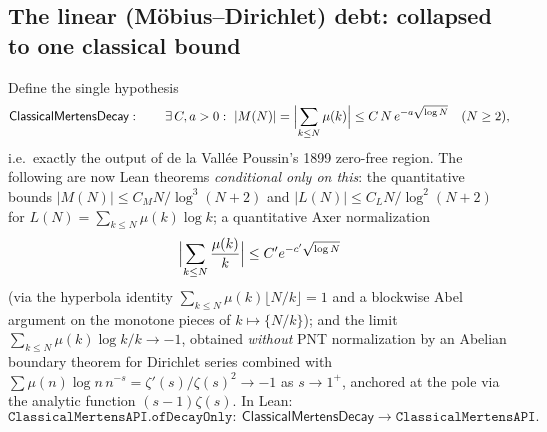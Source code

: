 \documentclass[11pt,a4paper]{article}
\newcommand{\fract}[1]{\{#1\}}
\begin{document}
\subsection{The linear (M\"obius--Dirichlet) debt: collapsed to one classical bound}
Define the single hypothesis
\[
\textsf{ClassicalMertensDecay}:\qquad
\exists\,C,a>0:\ |M(N)|=\Bigl|\sum_{k\le N}\mu(k)\Bigr|\le C\,N\,e^{-a\sqrt{\log N}}
\quad(N\ge2),
\]
i.e.\ exactly the output of de la Vall\'ee Poussin's 1899 zero-free region.
The following are now Lean theorems \emph{conditional only on this}:
the quantitative bounds $|M(N)|\le C_M N/\log^3(N{+}2)$ and
$|L(N)|\le C_L N/\log^2(N{+}2)$ for $L(N)=\sum_{k\le N}\mu(k)\log k$;
a quantitative Axer normalization
\[
\Bigl|\sum_{k\le N}\frac{\mu(k)}{k}\Bigr|\le C' e^{-c'\sqrt{\log N}}
\]
(via the hyperbola identity $\sum_{k\le N}\mu(k)\lfloor N/k\rfloor=1$ and a
blockwise Abel argument on the monotone pieces of $k\mapsto\fract{N/k}$); and
the limit $\sum_{k\le N}\mu(k)\log k/k\to-1$, obtained \emph{without} PNT
normalization by an Abelian boundary theorem for Dirichlet series combined
with $\sum\mu(n)\log n\,n^{-s}=\zeta'(s)/\zeta(s)^2\to-1$ as $s\to1^+$,
anchored at the pole via the analytic function $(s-1)\zeta(s)$. In Lean:
\[
\texttt{ClassicalMertensAPI.ofDecayOnly}:\ \textsf{ClassicalMertensDecay}
\longrightarrow \texttt{ClassicalMertensAPI}.
\]
\end{document}
